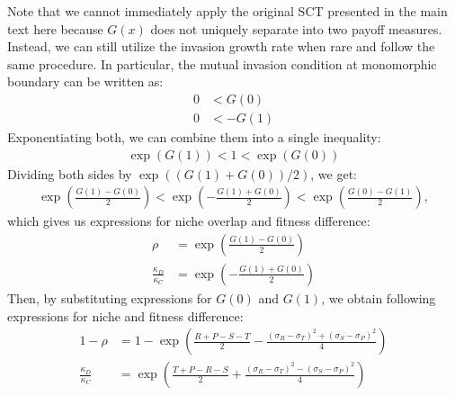 \documentclass[12pt]{article}
\begin{document}
Note that we cannot immediately apply the original SCT presented in the main text here because $G(x)$ does not uniquely separate into two payoff measures.
Instead, we can still utilize the invasion growth rate when rare and follow the same procedure.
In particular, the mutual invasion condition at monomorphic boundary can be written as:
\begin{align}
0 &< G(0)\\
0 &< -G(1)
\end{align}
Exponentiating both, we can combine them into a single inequality:
\begin{align}
\exp(G(1)) < 1< \exp(G(0))
\end{align}
Dividing both sides by $\exp((G(1) + G(0))/2)$, we get:
\begin{align}
\exp\left(\frac{G(1)-G(0)}{2}\right)<  \exp\left(-\frac{G(1)+G(0)}{2}\right) < \exp\left(\frac{G(0)-G(1)}{2}\right),
\end{align}
which gives us expressions for niche overlap and fitness difference:
\begin{align}
\rho &= \exp\left(\frac{G(1)-G(0)}{2}\right)\\
\frac{\kappa_D}{\kappa_C} &= \exp\left(-\frac{G(1)+G(0)}{2}\right)
\end{align}
Then, by substituting expressions for $G(0)$ and $G(1)$, we obtain following expressions for niche and fitness difference:
\begin{align}
1- \rho &= 1-\exp\left(\frac{R+P-S-T}{2} - \frac{(\sigma_R - \sigma_T)^2 + (\sigma_S - \sigma_P)^2}{4} \right)\\
\frac{\kappa_D}{\kappa_C} &= \exp\left(\frac{T+P-R-S}{2} + \frac{(\sigma_R - \sigma_T)^2 - (\sigma_S - \sigma_P)^2}{4} \right)
\end{align}
\end{document}
